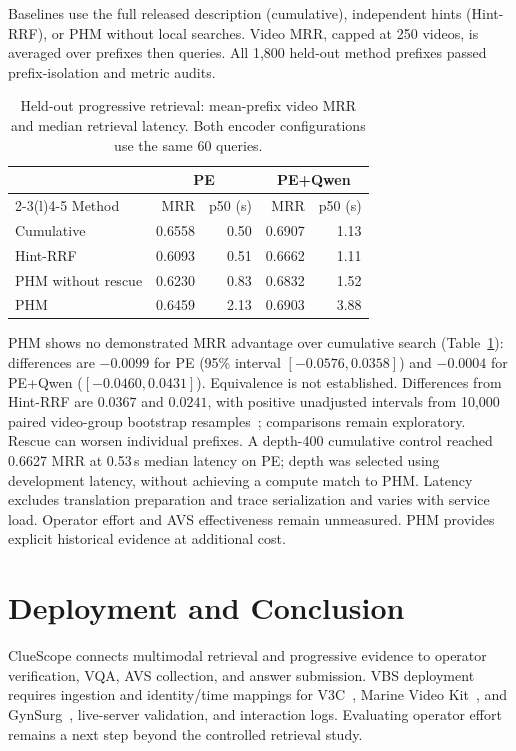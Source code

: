\documentclass[runningheads]{llncs}
\begin{document}
Baselines use the full released description (cumulative), independent hints
(Hint-RRF), or PHM without local searches. Video MRR, capped at 250 videos, is
averaged over prefixes then queries. All 1,800 held-out method prefixes passed
prefix-isolation and metric audits.

\begin{table}[htbp]
\caption{Held-out progressive retrieval: mean-prefix video MRR and median
retrieval latency. Both encoder configurations use the same 60 queries.}
\label{tab:results}
\centering
\setlength{\tabcolsep}{6pt}
\begin{tabular}{@{}lrrrr@{}}
\toprule
 & \multicolumn{2}{c}{PE} & \multicolumn{2}{c}{PE+Qwen}\\
\cmidrule(lr){2-3}\cmidrule(l){4-5}
Method & MRR & p50 (s) & MRR & p50 (s)\\
\midrule
Cumulative & 0.6558 & 0.50 & 0.6907 & 1.13\\
Hint-RRF & 0.6093 & 0.51 & 0.6662 & 1.11\\
PHM without rescue & 0.6230 & 0.83 & 0.6832 & 1.52\\
PHM & 0.6459 & 2.13 & 0.6903 & 3.88\\
\bottomrule
\end{tabular}
\end{table}

PHM shows no demonstrated MRR advantage over cumulative search
(Table~\ref{tab:results}): differences are $-0.0099$ for PE (95\% interval
$[-0.0576,0.0358]$) and $-0.0004$ for PE+Qwen ($[-0.0460,0.0431]$).
Equivalence is not established. Differences from Hint-RRF are $0.0367$ and
$0.0241$, with positive unadjusted intervals from 10,000 paired
video-group bootstrap resamples~\cite{efron1979}; comparisons remain exploratory.
Rescue can worsen individual prefixes. A depth-400 cumulative control reached
0.6627 MRR at 0.53\,s median latency on PE; depth was selected using development
latency, without achieving a compute match to PHM.
Latency excludes translation preparation and trace serialization and varies
with service load. Operator effort and AVS effectiveness remain unmeasured.
PHM provides explicit historical evidence at additional cost.

\section{Deployment and Conclusion}
ClueScope connects multimodal retrieval and progressive evidence to operator
verification, VQA, AVS collection, and answer submission. VBS deployment requires
ingestion and identity/time mappings for V3C~\cite{v3c2019}, Marine Video
Kit~\cite{mvk2023}, and GynSurg~\cite{gynsurg2025},
live-server validation, and interaction logs. Evaluating operator effort remains
a next step beyond the controlled retrieval study.

\clearpage


\end{document}
